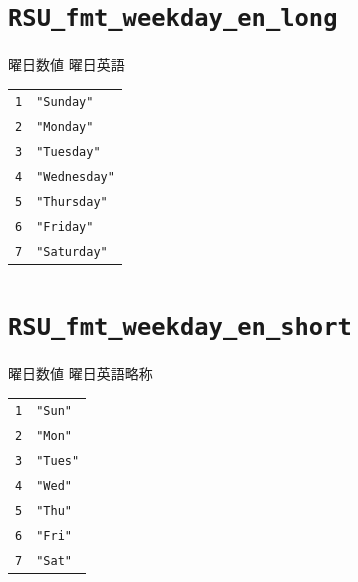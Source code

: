 \section{\texttt{RSU\_fmt\_weekday\_en\_long}}
\paragraph{\DocStrTitleRDMPredefinedFormatConversion}曜日数値  曜日英語
\begin{center}
\begin{xltabular}{\textwidth}{|p{7truecm}|X|}
\hline
\thead{\DocStrHeaderFormatInput}&\thead{\DocStrHeaderFormatOutput}\\
\hline
\hline
\texttt{1}&\texttt{"Sunday"}\\
\hline
\texttt{2}&\texttt{"Monday"}\\
\hline
\texttt{3}&\texttt{"Tuesday"}\\
\hline
\texttt{4}&\texttt{"Wednesday"}\\
\hline
\texttt{5}&\texttt{"Thursday"}\\
\hline
\texttt{6}&\texttt{"Friday"}\\
\hline
\texttt{7}&\texttt{"Saturday"}\\
\hline
\end{xltabular}
\end{center}
\section{\texttt{RSU\_fmt\_weekday\_en\_short}}
\paragraph{\DocStrTitleRDMPredefinedFormatConversion}曜日数値  曜日英語略称
\begin{center}
\begin{xltabular}{\textwidth}{|p{7truecm}|X|}
\hline
\thead{\DocStrHeaderFormatInput}&\thead{\DocStrHeaderFormatOutput}\\
\hline
\hline
\texttt{1}&\texttt{"Sun"}\\
\hline
\texttt{2}&\texttt{"Mon"}\\
\hline
\texttt{3}&\texttt{"Tues"}\\
\hline
\texttt{4}&\texttt{"Wed"}\\
\hline
\texttt{5}&\texttt{"Thu"}\\
\hline
\texttt{6}&\texttt{"Fri"}\\
\hline
\texttt{7}&\texttt{"Sat"}\\
\hline
\end{xltabular}
\end{center}
